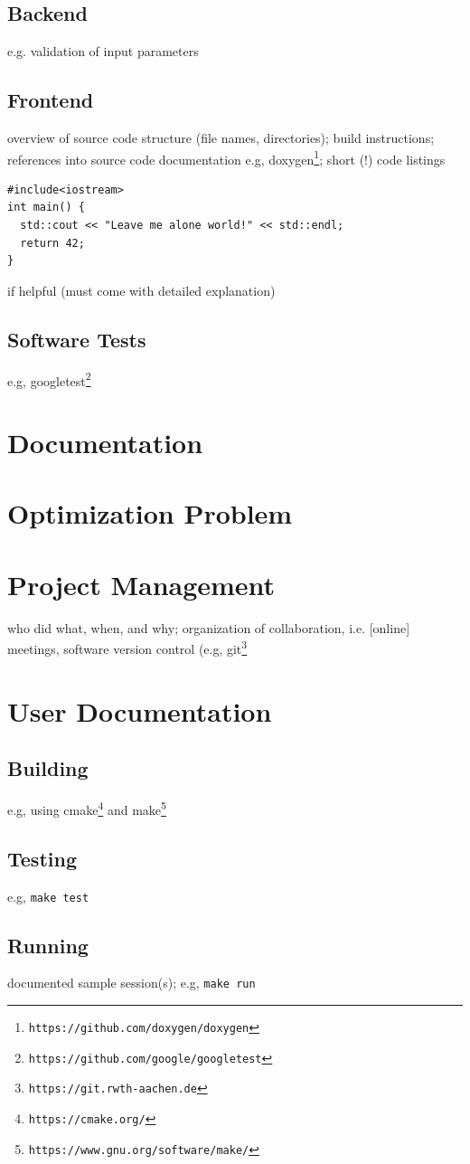 \documentclass{article}
\begin{document}
\subsection{Backend}
e.g. validation of input parameters

\subsection{Frontend}

overview of source code structure (file names, directories); build instructions; references into source code documentation e.g, doxygen\footnote{\tt https://github.com/doxygen/doxygen}; short (!) code listings
\begin{lstlisting}
#include<iostream>
int main() {
  std::cout << "Leave me alone world!" << std::endl;
  return 42;
}
\end{lstlisting}
if helpful (must come with detailed explanation)

\subsection{Software Tests}

e.g, googletest\footnote{\tt https://github.com/google/googletest}

\section{Documentation}\label{ch:doc}

\section{Optimization Problem}\label{ch:optimization-problem}


\section{Project Management} \label{ch:projectmanagement}

who did what, when, and why; organization of collaboration, i.e. [online] meetings, software version control (e.g, git\footnote{\tt https://git.rwth-aachen.de}




\appendix

\section{User Documentation} \label{ch:userdoc}

\subsection{Building}

e.g, using cmake\footnote{\tt https://cmake.org/} and make\footnote{\tt https://www.gnu.org/software/make/}


\subsection{Testing}

e.g, \verb!make test!

\subsection{Running}

documented sample session(s); e.g, \verb!make run!
\end{document}
